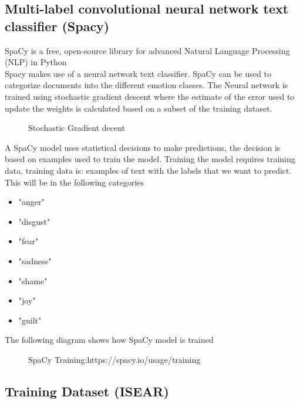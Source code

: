 \clearpage
\subsection{Multi-label convolutional neural network text classifier (Spacy)}

SpaCy is a free, open-source library for advanced Natural Language Processing (NLP) in Python \\
Spacy makes use of a neural network text classifier. SpaCy can be used to categorize documents into the different emotion classes.
The Neural network is trained using stochastic gradient descent where the estimate of the error used to update the weights is calculated based on a subset of the training dataset. \\


\begin{figure}[h]
  \centering
  \caption[Stochastic Gradient decent]%
  {Stochastic Gradient decent}
  \label{fig:ALAP:sm3}
\end{figure}






A SpaCy model uses statistical decisions to make predictions, the decision is based on examples used to train the model. Training the model requires training data, training data is: examples of text with the labels that we want to predict. This will be in the following categories
\begin{itemize}
\item "anger"
\item "disgust"
\item "fear"
\item "sadness"
\item "shame"
\item "joy"
\item "guilt"
\end{itemize}




The following diagram shows how SpaCy model is trained

\begin{figure}[h]
  \centering
  \caption[SpaCy Training]%
  {SpaCy Training:https://spacy.io/usage/training}
  \label{fig:ALAP:sm3}
\end{figure}
 
\clearpage

\subsection{Training Dataset (ISEAR)}


